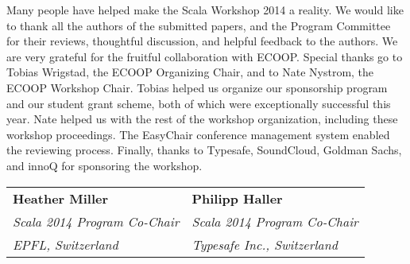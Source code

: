 \documentclass[10pt]{book}
\begin{document}
\noindent
Many people have helped make the Scala Workshop 2014 a reality. We would like
to thank all the authors of the submitted papers, and the Program Committee
for their reviews, thoughtful discussion, and helpful feedback to the authors.
We are very grateful for the fruitful collaboration with ECOOP. Special thanks
go to Tobias Wrigstad, the ECOOP Organizing Chair, and to Nate Nystrom, the
ECOOP Workshop Chair. Tobias helped us organize our sponsorship program and
our student grant scheme, both of which were exceptionally successful this
year. Nate helped us with the rest of the workshop organization, including
these workshop proceedings. The EasyChair conference management system enabled
the reviewing  process. Finally, thanks to Typesafe, SoundCloud, Goldman
Sachs, and innoQ for sponsoring the workshop.
\\

\begin{tabular}{ll}
{\bf Heather Miller}              & {\bf Philipp Haller}\\
{\em Scala 2014 Program Co-Chair} & {\em Scala 2014 Program Co-Chair}\\
{\em EPFL, Switzerland}           & {\em Typesafe Inc., Switzerland}\\
\end{tabular}
\end{document}
